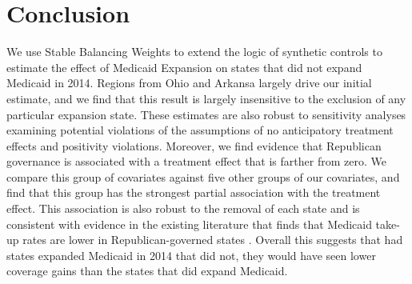 \documentclass[12pt]{article}
\begin{document}
\section{Conclusion}
\label{sec:conc}

We use Stable Balancing Weights to extend the logic of synthetic controls to estimate the effect of Medicaid Expansion on states that did not expand Medicaid in 2014. Regions from Ohio and Arkansa largely drive our initial estimate, and we find that this result is largely insensitive to the exclusion of any particular expansion state. These estimates are also robust to sensitivity analyses examining potential violations of the assumptions of no anticipatory treatment effects and positivity violations. Moreover, we find evidence that Republican governance is associated with a treatment effect that is farther from zero. We compare this group of covariates against five other groups of our covariates, and find that this group has the strongest partial association with the treatment effect. This association is also robust to the removal of each state and is consistent with evidence in the existing literature that finds that Medicaid take-up rates are lower in Republican-governed states \cite{sommers2012understanding}. Overall this suggests that had states expanded Medicaid in 2014 that did not, they would have seen lower coverage gains than the states that did expand Medicaid.

\bigskip

%

 
\end{document}
